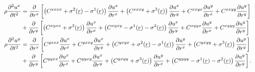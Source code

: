 \documentclass[twoside,twocolumn,9pt]{article}
\begin{document}
\begin{appendix}
\begin{strip}
\begin{align}
\rho\frac{\partial^2u^x}{\partial t^2}&=\frac{\partial}{\partial r^x}\left[\left(C^{xxxx}+\sigma^2(\underline{r})-\sigma^1(\underline{r})\right)\frac{\partial u^x}{\partial r^x}+\left(C^{xxxy}+\sigma^3(\underline{r})\right)\frac{\partial u^x}{\partial r^y}+C^{xxyx}\frac{\partial u^y}{\partial r^x}+C^{xxyy}\frac{\partial u^y}{\partial r^y}\right]\notag\\
&+\frac{\partial}{\partial r^y}\left[\left(C^{xyxx}+\sigma^3(\underline{r})\right)\frac{\partial u^x}{\partial r^x}+\left(C^{xyxy}-\sigma^1(\underline{r})-\sigma^2(\underline{r})\right)\frac{\partial u^x}{\partial r^y}+C^{xyyx}\frac{\partial u^y}{\partial r^x}+C^{xyyy}\frac{\partial u^y}{\partial r^y}\right]\notag\\
\rho\frac{\partial^2 u^y}{\partial t^2}&=\frac{\partial}{\partial r^x}\left[C^{yxxx}\frac{\partial u^x}{\partial r^x}+C^{yxxy}\frac{\partial u^x}{\partial r^y}+\left(C^{yxyx}+\sigma^2(\underline{r})-\sigma^1(\underline{r})\right)\frac{\partial u^y}{\partial r^x}+\left(C^{yxyy}+\sigma^3(\underline{r})\right)\frac{\partial u^y}{\partial r^y}\right]\notag\\
&+\frac{\partial}{\partial r^y}\left[C^{yyxx}\frac{\partial u^x}{\partial r^x}+C^{yyxy}\frac{\partial u^x}{\partial r^y}+\left(C^{yxyy}+\sigma^3(\underline{r})\right)\frac{\partial u^y}{\partial r^x}+\left(C^{yyyy}-\sigma^1(\underline{r})-\sigma^2(\underline{r})\right)\frac{\partial u^y}{\partial r^y}\right].
\end{align}
\end{strip}

\end{appendix}
\end{document}
